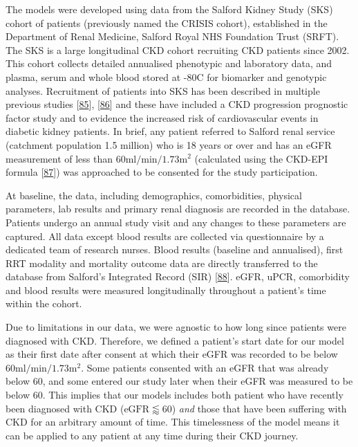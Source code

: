 \documentclass[12pt,PhD,twoside,openright]{muthesis}
\begin{document}
The models were developed using data from the Salford Kidney Study (SKS) cohort of patients (previously named the CRISIS cohort), established in the Department of Renal Medicine, Salford Royal NHS Foundation Trust (SRFT). The SKS is a large longitudinal CKD cohort recruiting CKD patients since 2002. This cohort collects detailed annualised phenotypic and laboratory data, and plasma, serum and whole blood stored at -80\textdegree C for biomarker and genotypic analyses. Recruitment of patients into SKS has been described in multiple previous studies {[}\protect\hyperlink{ref-hoefield_factors_2010}{85}{]}, {[}\protect\hyperlink{ref-chinnadurai_increased_2019-1}{86}{]} and these have included a CKD progression prognostic factor study and to evidence the increased risk of cardiovascular events in diabetic kidney patients. In brief, any patient referred to Salford renal service (catchment population 1.5 million) who is 18 years or over and has an eGFR measurement of less than \(60\textrm{ml}/\textrm{min}/1.73\textrm{m}^2\) (calculated using the CKD-EPI formula {[}\protect\hyperlink{ref-levey_new_2009}{87}{]}) was approached to be consented for the study participation.

At baseline, the data, including demographics, comorbidities, physical parameters, lab results and primary renal diagnosis are recorded in the database. Patients undergo an annual study visit and any changes to these parameters are captured. All data except blood results are collected via questionnaire by a dedicated team of research nurses. Blood results (baseline and annualised), first RRT modality and mortality outcome data are directly transferred to the database from Salford's Integrated Record (SIR) {[}\protect\hyperlink{ref-new_obtaining_2014}{88}{]}. eGFR, uPCR, comorbidity and blood results were measured longitudinally throughout a patient's time within the cohort.

Due to limitations in our data, we were agnostic to how long since patients were diagnosed with CKD. Therefore, we defined a patient's start date for our model as their first date after consent at which their eGFR was recorded to be below \(60\textrm{ml}/\textrm{min}/1.73\textrm{m}^2\). Some patients consented with an eGFR that was already below 60, and some entered our study later when their eGFR was measured to be below 60. This implies that our models includes both patient who have recently been diagnosed with CKD (\(\textrm{eGFR} \lessapprox 60\)) \emph{and} those that have been suffering with CKD for an arbitrary amount of time. This timelessness of the model means it can be applied to any patient at any time during their CKD journey.
\end{document}
